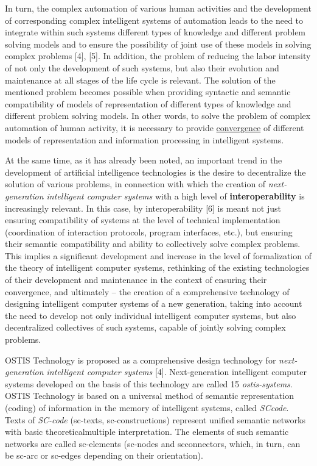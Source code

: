 \documentclass[a4paper,10pt]{article}
\begin{document}
\begin{multicols}{2}
In turn, the complex automation of various human
activities and the development of corresponding complex
intelligent systems of automation leads to the need to
integrate within such systems different types of knowledge and different problem solving models and to ensure
the possibility of joint use of these models in solving
complex problems [4], [5]. In addition, the problem of
reducing the labor intensity of not only the development
of such systems, but also their evolution and maintenance
at all stages of the life cycle is relevant. The solution of
the mentioned problem becomes possible when providing
syntactic and semantic compatibility of models of representation of different types of knowledge and different
problem solving models. In other words, to solve the
problem of complex automation of human activity, it is
necessary to provide \underline{convergence} of different models of
representation and information processing in intelligent
systems. 


At the same time, as it has already been noted, an important trend in the development of artificial intelligence
technologies is the desire to decentralize the solution of
various problems, in connection with which the creation
of \textit{next-generation intelligent computer systems} with a
high level of \textbf{interoperability} is increasingly relevant.
In this case, by interoperability [6] is meant not just
ensuring compatibility of systems at the level of technical
implementation (coordination of interaction protocols,
program interfaces, etc.), but ensuring their semantic
compatibility and ability to collectively solve complex
problems. This implies a significant development and
increase in the level of formalization of the theory of
intelligent computer systems, rethinking of the existing
technologies of their development and maintenance in the
context of ensuring their convergence, and ultimately –
the creation of a comprehensive technology of designing
intelligent computer systems of a new generation, taking
into account the need to develop not only individual intelligent computer systems, but also decentralized collectives of such systems, capable of jointly solving complex
problems.


OSTIS Technology is proposed as a comprehensive design technology for \textit{next-generation intelligent computer systems} [4]. Next-generation intelligent computer systems
developed on the basis of this technology are called
15
\textit{ostis-systems}. OSTIS Technology is based on a universal
method of semantic representation (coding) of information in the memory of intelligent systems, called \textit{SCcode}. Texts of \textit{SC-code} (sc-texts, sc-constructions) represent unified semantic networks with basic theoreticalmultiple interpretation. The elements of such semantic networks are called sc-elements (sc-nodes and scconnectors, which, in turn, can be sc-arc or sc-edges
depending on their orientation). 



\end{multicols}
\end{document}
